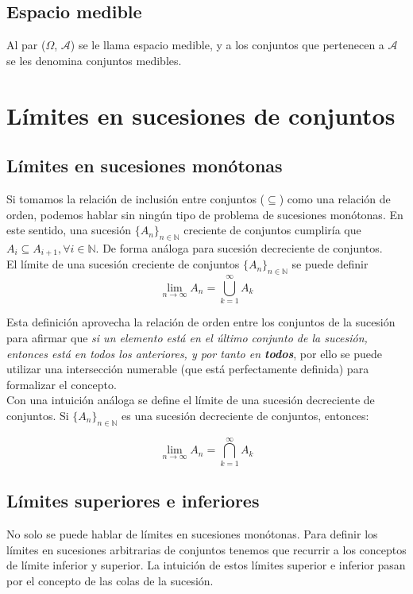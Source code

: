 \documentclass[12pt,a4paper]{book}
\begin{document}
\subsection*{Espacio medible}

Al par ($\Omega$, $\mathcal{A}$) se le llama espacio medible, y a los conjuntos que pertenecen a $\mathcal{A}$ se les denomina conjuntos medibles.

\section{Límites en sucesiones de conjuntos}

\subsection{Límites en sucesiones monótonas}

Si tomamos la relación de inclusión entre conjuntos ($\subseteq$) como una relación de orden, podemos hablar sin ningún tipo de problema de sucesiones monótonas. En este sentido, una sucesión   $\{A_n\}_{n \in \mathbb{N}}$  creciente de conjuntos cumpliría que $A_i \subseteq A_{i+1}, \forall i \in \mathbb{N}$. De forma análoga para sucesión decreciente de conjuntos.\\

El límite de una sucesión creciente de conjuntos $\{A_n\}_{n \in \mathbb{N} }$ se puede definir
$$\lim_{n\to\infty} A_n = \bigcup_{k=1}^{\infty} A_k$$

Esta definición aprovecha la relación de orden entre los conjuntos de la sucesión para afirmar que \textit{si un elemento está en el último conjunto de la sucesión, entonces está en todos los anteriores, y por tanto en \textbf{todos}}, por ello se puede utilizar una intersección numerable (que está perfectamente definida) para formalizar el concepto.\\

Con una intuición análoga se define el límite de una sucesión decreciente de conjuntos. Si $\{A_n\}_{n\in\mathbb{N}}$ es una sucesión decreciente de conjuntos, entonces:

$$ \lim_{n\to\infty} A_n = \bigcap_{k=1}^{\infty} A_k $$

\subsection{Límites superiores e inferiores}

No solo se puede hablar de límites en sucesiones monótonas. 
Para definir los límites en sucesiones arbitrarias de conjuntos tenemos que recurrir a los conceptos de límite inferior y superior. 
La intuición de estos límites superior e inferior pasan por el concepto de las colas de la sucesión.\\
\end{document}
